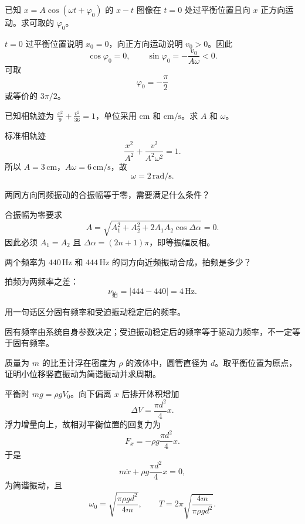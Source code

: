 \begin{exercise}[level=advanced]
已知 $x=A\cos(\omega t+\varphi_0)$ 的 $x-t$ 图像在 $t=0$ 处过平衡位置且向 $x$ 正方向运动。求可取的 $\varphi_0$。
\begin{solution}
$t=0$ 过平衡位置说明 $x_0=0$，向正方向运动说明 $v_0>0$。因此
\[
  \cos\varphi_0=0,\qquad
  \sin\varphi_0=-\frac{v_0}{A\omega}<0.
\]
可取
\[
  \varphi_0=-\frac{\pi}{2}
\]
或等价的 $3\pi/2$。
\end{solution}
\end{exercise}

\begin{exercise}[level=advanced]
已知相轨迹为 $\frac{x^2}{9}+\frac{v^2}{36}=1$，单位采用 $\mathrm{cm}$ 和 $\mathrm{cm/s}$。求 $A$ 和 $\omega$。
\begin{solution}
标准相轨迹
\[
  \frac{x^2}{A^2}+\frac{v^2}{A^2\omega^2}=1.
\]
所以 $A=3\,\mathrm{cm}$，$A\omega=6\,\mathrm{cm/s}$，故
\[
  \omega=2\,\mathrm{rad/s}.
\]
\end{solution}
\end{exercise}

\begin{exercise}[level=advanced]
两同方向同频振动的合振幅等于零，需要满足什么条件？
\begin{solution}
合振幅为零要求
\[
  A=\sqrt{A_1^2+A_2^2+2A_1A_2\cos\Delta\alpha}=0.
\]
因此必须 $A_1=A_2$ 且 $\Delta\alpha=(2n+1)\pi$，即等振幅反相。
\end{solution}
\end{exercise}

\begin{exercise}[level=standard]
两个频率为 $440\,\mathrm{Hz}$ 和 $444\,\mathrm{Hz}$ 的同方向近频振动合成，拍频是多少？
\begin{solution}
拍频为两频率之差：
\[
  \nu_{\text{拍}}=|444-440|=4\,\mathrm{Hz}.
\]
\end{solution}
\end{exercise}

\begin{exercise}[level=standard]
用一句话区分固有频率和受迫振动稳定后的频率。
\begin{solution}
固有频率由系统自身参数决定；受迫振动稳定后的频率等于驱动力频率，不一定等于固有频率。
\end{solution}
\end{exercise}

\begin{exercise}[level=advanced]
质量为 $m$ 的比重计浮在密度为 $\rho$ 的液体中，圆管直径为 $d$。取平衡位置为原点，证明小位移竖直振动为简谐振动并求周期。
\begin{solution}
平衡时 $mg=\rho gV_0$。向下偏离 $x$ 后排开体积增加
\[
  \Delta V=\frac{\pi d^2}{4}x.
\]
浮力增量向上，故相对平衡位置的回复力为
\[
  F_x=-\rho g\frac{\pi d^2}{4}x.
\]
于是
\[
  m\ddot x+\rho g\frac{\pi d^2}{4}x=0,
\]
为简谐振动，且
\[
  \omega_0=\sqrt{\frac{\pi\rho gd^2}{4m}},\qquad
  T=2\pi\sqrt{\frac{4m}{\pi\rho gd^2}}.
\]
\end{solution}
\end{exercise}

